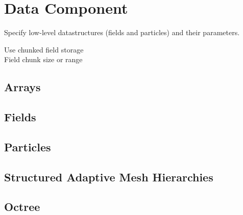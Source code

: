 \section{Data Component} \label{s:component-data}

Specify low-level datastructures (fields and particles) and their
parameters.

Use chunked field storage \\
Field chunk size or range


\subsection{Arrays}

\subsection{Fields}

\subsection{Particles}

\subsection{Structured Adaptive Mesh Hierarchies}

\subsection{Octree}

